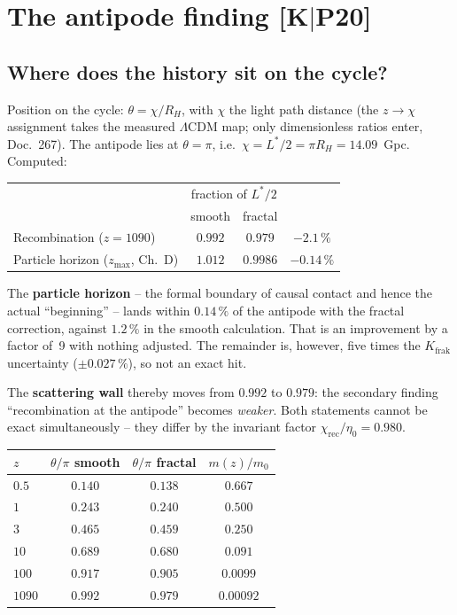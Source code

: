 \chapter{The antipode finding [K$|$P20]}

\section{Where does the history sit on the cycle?}

Position on the cycle: $\theta = \chi/R_H$, with $\chi$ the light
path distance (the $z \to \chi$ assignment takes the measured
$\Lambda$CDM map; only dimensionless ratios enter, Doc.~267). The
antipode lies at $\theta = \pi$, i.e.\
$\chi = L^{*}/2 = \pi R_H = 14.09$~Gpc. Computed:

\begin{center}
\begin{tabular}{lccc}
\toprule
 & \multicolumn{2}{c}{fraction of $L^{*}/2$} & \\
 & smooth & fractal & \\
\midrule
Recombination ($z=1090$) & $0.992$ & $0.979$ & $-2.1\,\%$ \\
Particle horizon ($z_\text{max}$, Ch.~D) & $1.012$ & $\mathbf{0.9986}$
  & $\mathbf{-0.14\,\%}$ \\
\bottomrule
\end{tabular}
\end{center}

\noindent The \textbf{particle horizon} -- the formal boundary of
causal contact and hence the actual \enquote{beginning} -- lands
within $0.14\,\%$ of the antipode with the fractal correction,
against $1.2\,\%$ in the smooth calculation. That is an
improvement by a factor of~9 with nothing adjusted. The remainder
is, however, five times the $K_\text{frak}$ uncertainty
($\pm0.027\,\%$), so not an exact hit.

The \textbf{scattering wall} thereby moves from $0.992$ to
$0.979$: the secondary finding \enquote{recombination at the
antipode} becomes \emph{weaker}. Both statements cannot be exact
simultaneously -- they differ by the invariant factor
$\chi_\text{rec}/\eta_0 = 0.980$.

\begin{center}
\begin{tabular}{lccc}
\toprule
$z$ & $\theta/\pi$ smooth & $\theta/\pi$ fractal & $m(z)/m_0$ \\
\midrule
$0.5$ & $0.140$ & $0.138$ & $0.667$ \\
$1$ & $0.243$ & $0.240$ & $0.500$ \\
$3$ & $0.465$ & $0.459$ & $0.250$ \\
$10$ & $0.689$ & $0.680$ & $0.091$ \\
$100$ & $0.917$ & $0.905$ & $0.0099$ \\
$1090$ & $0.992$ & $0.979$ & $0.00092$ \\
\bottomrule
\end{tabular}
\end{center}

